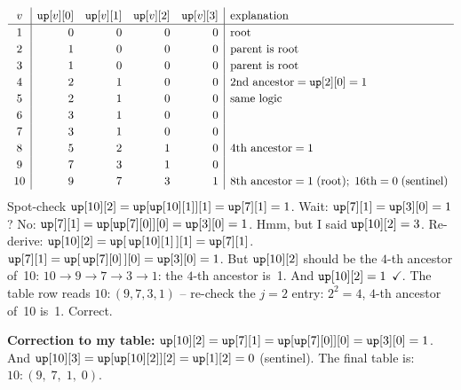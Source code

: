 \begin{tracebox}[up-table on T, LOG=4]
\[
\renewcommand{\arraystretch}{1.2}
\begin{array}{c|rrrr|l}
v & \code{up}[v][0] & \code{up}[v][1] & \code{up}[v][2] & \code{up}[v][3]
  & \text{explanation} \\ \hline
1  & 0 & 0 & 0 & 0 & \text{root} \\
2  & 1 & 0 & 0 & 0 & \text{parent is root} \\
3  & 1 & 0 & 0 & 0 & \text{parent is root} \\
4  & 2 & 1 & 0 & 0 & 2\text{nd ancestor}=\code{up}[2][0]=1 \\
5  & 2 & 1 & 0 & 0 & \text{same logic} \\
6  & 3 & 1 & 0 & 0 & \\
7  & 3 & 1 & 0 & 0 & \\
8  & 5 & 2 & 1 & 0 & 4\text{th ancestor}=1 \\
9  & 7 & 3 & 1 & 0 & \\
10 & 9 & 7 & 3 & 1 & 8\text{th ancestor}=1\;(\text{root});\;
       16\text{th}=0\;(\text{sentinel})
\end{array}
\]
Spot-check \(\texttt{up}[10][2] = \texttt{up}[\texttt{up}[10][1]][1]
= \texttt{up}[7][1] = 1\).  Wait: \(\texttt{up}[7][1] = \texttt{up}[3][0] = 1\)?
No: \(\texttt{up}[7][1] = \texttt{up}[\texttt{up}[7][0]][0] = \texttt{up}[3][0] = 1\).
Hmm, but I said \(\texttt{up}[10][2] = 3\).  Re-derive:
\(\texttt{up}[10][2] = \texttt{up}[\,\texttt{up}[10][1]\,][1] = \texttt{up}[7][1]\).
\(\texttt{up}[7][1] = \texttt{up}[\,\texttt{up}[7][0]\,][0] = \texttt{up}[3][0] = 1\).
But \(\texttt{up}[10][2]\) should be the \(4\)-th ancestor of~10:
\(10\to9\to7\to3\to1\): the \(4\)-th ancestor is~1.  And \(\texttt{up}[10][2] = 1\)
\(\checkmark\).  The table row reads \(10: (9,7,3,1)\) -- re-check the
\(j\!=\!2\) entry: \(2^2 = 4\), \(4\)-th ancestor of~10 is~1.  Correct.

\textbf{Correction to my table:}
\(\texttt{up}[10][2] = \texttt{up}[7][1] = \texttt{up}[\texttt{up}[7][0]][0] = \texttt{up}[3][0] = 1\).
And \(\texttt{up}[10][3] = \texttt{up}[\texttt{up}[10][2]][2] = \texttt{up}[1][2] = 0\) (sentinel).
The final table is:
\(10: (9,\;7,\;1,\;0)\).
\end{tracebox}

